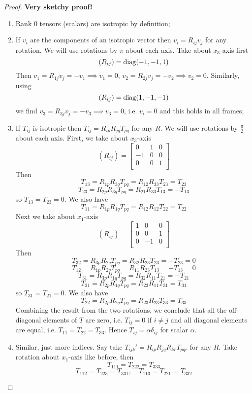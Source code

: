 \documentclass[a4paper]{article}
\begin{document}
\begin{proof}
\textbf{Very sketchy proof!}
\begin{enumerate}
    \item Rank 0 tensors (scalars) are isotropic by definition;
    \item If $v_i$ are the components of an isotropic vector then $v_i=R_{ij}v_j$ for any rotation. We will use rotations by $\pi$ about each axis. Take about $x_3$-axis first
    $$(R_{ij})=\operatorname{diag}(-1,-1,1)$$
    Then $v_1=R_{1j}v_j=-v_1\implies v_1=0$, $v_2=R_{2j}v_j=-v_2\implies v_2=0$. Similarly, using
    $$(R_{ij})=\operatorname{diag}(1,-1,-1)$$
    we find $v_3=R_{3j}v_j=-v_3\implies v_3=0$, i.e. $v_i=0$ and this holds in all frames;
    \item If $T_{ij}$ is isotropic then $T_{ij}=R_{ip}R_{jq}T_{pq}$ for any $R$. We will use rotations by $\frac{\pi}{2}$ about each axis. First, we take about $x_3$-axis
    $$(R_{ij})=\begin{bmatrix}0&1&0\\-1&0&0\\0&0&1\\\end{bmatrix}$$
    Then 
    $$T_{13}=R_{1p}R_{3q}T_{pq}=R_{12}R_{33}T_{23}=T_{23}$$
    $$T_{23}=R_{2p}R_{3q}T_{pq}=R_{21}R_{33}T_{13}=-T_{13}$$
    so $T_{13}=T_{23}=0$. We also have
    $$T_{11}=R_{1p}R_{1q}T_{pq}=R_{12}R_{12}T_{22}=T_{22}$$
    Next we take about $x_1$-axis
    $$(R_{ij})=\begin{bmatrix}1&0&0\\0&0&1\\0&-1&0\\\end{bmatrix}$$
    Then
    $$T_{32}=R_{3p}R_{2q}T_{pq}=R_{32}R_{23}T_{23}=-T_{23}=0$$
    $$T_{12}=R_{1p}R_{2q}T_{pq}=R_{11}R_{23}T_{13}=-T_{13}=0$$
    $$T_{31}=R_{3p}R_{1q}T_{pq}=R_{32}R_{11}T_{21}=-T_{21}$$
    $$T_{21}=R_{2p}R_{1q}T_{pq}=R_{23}R_{11}T_{31}=T_{31}$$
    so $T_{31}=T_{21}=0$. We also have
    $$T_{22}=R_{2p}R_{2q}T_{pq}=R_{23}R_{23}T_{33}=T_{33}$$
    Combining the result from the two rotations, we conclude that all the off-diagonal elements of $T$ are zero, i.e. $T_{ij}=0$ if $i\neq j$ and all diagonal elements are equal, i.e. $T_{11}=T_{22}=T_{33}$. Hence $T_{ij}=\alpha\delta_{ij}$ for scalar $\alpha$.
    \item Similar, just more indices. Say take $T_{ijk}'=R_{ip}R_{jq}R_{kr}T_{pqr}$ for any $R$. Take rotation about $x_1$-axis like before, then
    $$T_{111}=T_{222}=T_{333}$$
    $$T_{112}=T_{223}=T_{331},\quad T_{113}=T_{221}=T_{332}$$

\end{enumerate}
\end{proof}
\end{document}
